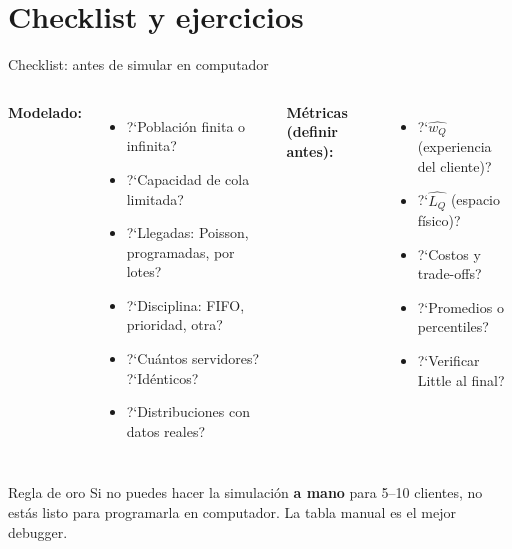 \documentclass[aspectratio=1610, 9pt]{beamer}
\begin{document}
\section{Checklist y ejercicios}

\begin{frame}{Checklist: antes de simular en computador}

\begin{columns}
\textbf{Modelado:}
\begin{itemize}
    \item ?`Poblaci\'{o}n finita o infinita?
    \item ?`Capacidad de cola limitada?
    \item ?`Llegadas: Poisson, programadas, por lotes?
    \item ?`Disciplina: FIFO, prioridad, otra?
    \item ?`Cu\'{a}ntos servidores? ?`Id\'{e}nticos?
    \item ?`Distribuciones con datos reales?
\end{itemize}

\textbf{M\'{e}tricas (definir antes):}
\begin{itemize}
    \item ?`$\widehat{w_Q}$ (experiencia del cliente)?
    \item ?`$\widehat{L_Q}$ (espacio f\'{i}sico)?
    \item ?`Costos y trade-offs?
    \item ?`Promedios o percentiles?
    \item ?`Verificar Little al final?
\end{itemize}
\end{columns}

\vspace{0.4cm}
\begin{alertblock}{Regla de oro}
Si no puedes hacer la simulaci\'{o}n \textbf{a mano} para 5--10 clientes, no est\'{a}s listo para programarla en computador. La tabla manual es el mejor debugger.
\end{alertblock}
\end{frame}
\end{document}
